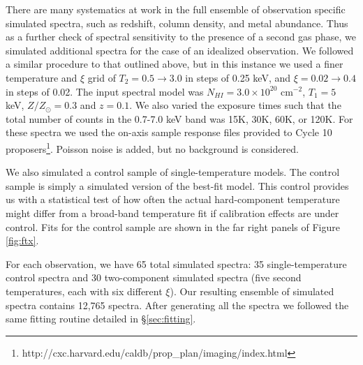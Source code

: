 \documentclass[apj]{emulateapj}
\begin{document}
There are many systematics at work in the full ensemble of observation
specific simulated spectra, such as redshift, column density, and
metal abundance. Thus as a further check of spectral sensitivity to
the presence of a second gas phase, we simulated additional spectra
for the case of an idealized observation. We followed a similar
procedure to that outlined above, but in this instance we used a finer
temperature and $\xi$ grid of $T_2 = 0.5 \rightarrow 3.0$ in steps of
0.25 keV, and $\xi = 0.02 \rightarrow 0.4$ in steps of 0.02. The
input spectral model was $N_{HI} = 3.0\times10^{20}$ cm$^{-2}$, $T_1 = 5$
keV, $Z/Z_{\odot} = 0.3$ and $z = 0.1$. We also varied the exposure
times such that the total number of counts in the 0.7-7.0 keV band was
15K, 30K, 60K, or 120K. For these spectra we used the on-axis sample
response files provided to Cycle 10
proposers\footnote{http://cxc.harvard.edu/caldb/prop\_plan/imaging/index.html}.
Poisson noise is added, but no background is considered.

We also simulated a control sample of single-temperature models. The
control sample is simply a simulated version of the best-fit
model. This control provides us with a statistical test of how often
the actual hard-component temperature might differ from a broad-band
temperature fit if calibration effects are under control. Fits for the
control sample are shown in the far right panels of Figure
\ref{fig:ftx}.

For each observation, we have 65 total simulated spectra: 35
single-temperature control spectra and 30 two-component simulated
spectra (five second temperatures, each with six different $\xi$). Our
resulting ensemble of simulated spectra contains 12,765 spectra. After
generating all the spectra we followed the same fitting routine
detailed in \S\ref{sec:fitting}.
\end{document}
